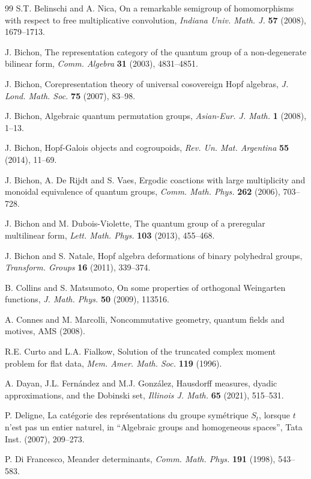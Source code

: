 \documentclass[11pt]{amsart}
\theoremstyle{definition}
\begin{document}
\begin{thebibliography}{99}
 S.T. Belinschi and A. Nica, On a remarkable semigroup of homomorphisms with respect to free multiplicative convolution, {\em Indiana Univ. Math. J.} {\bf 57} (2008), 1679--1713.

 J. Bichon, The representation category of the quantum group of a non-degenerate bilinear form, {\em Comm. Algebra} {\bf 31} (2003), 4831--4851.

 J. Bichon, Corepresentation theory of universal cosovereign Hopf algebras, {\em J. Lond. Math. Soc.} {\bf 75} (2007), 83--98.

 J. Bichon, Algebraic quantum permutation groups, {\em Asian-Eur. J. Math.} {\bf 1} (2008), 1--13.

 J. Bichon, Hopf-Galois objects and cogroupoids, {\em Rev. Un. Mat. Argentina} {\bf 55} (2014), 11--69.

 J. Bichon, A. De Rijdt and S. Vaes, Ergodic coactions with large multiplicity and monoidal equivalence of quantum groups, {\em Comm. Math. Phys.} {\bf 262} (2006), 703--728.

 J. Bichon and M. Dubois-Violette, The quantum group of a preregular multilinear form, {\em Lett. Math. Phys.} {\bf 103} (2013), 455--468.

 J. Bichon and S. Natale, Hopf algebra deformations of binary polyhedral groups, {\em Transform. Groups} {\bf 16} (2011), 339--374.

 B. Collins and S. Matsumoto, On some properties of orthogonal Weingarten functions, {\em J. Math. Phys.} {\bf 50} (2009), 113516.

 A. Connes and M. Marcolli, Noncommutative geometry, quantum fields and motives, AMS (2008).

 R.E. Curto and L.A. Fialkow, Solution of the truncated complex moment problem for flat data, {\em Mem. Amer. Math. Soc.} {\bf 119} (1996).

 A. Dayan, J.L. Fern\'andez and M.J. Gonz\'alez, Hausdorff measures, dyadic approximations, and the Dobinski set, {\em Illinois J. Math.} {\bf 65} (2021), 515--531.

 P. Deligne, La cat\'egorie des repr\'esentations du groupe sym\'etrique $S_t$, lorsque $t$ n'est pas un entier naturel, in ``Algebraic groups and homogeneous spaces'', Tata Inst. (2007), 209--273.

 P. Di Francesco, Meander determinants, {\em Comm. Math. Phys.} {\bf 191} (1998), 543--583.


\end{thebibliography}
\end{document}
